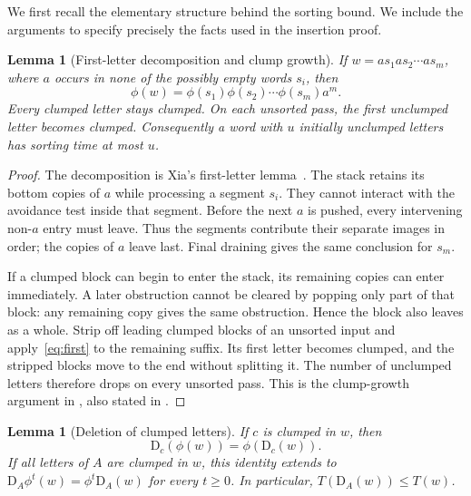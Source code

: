 \documentclass[11pt,a4paper]{article}
\newtheorem{lemma}[theorem]{Lemma}
\newcommand{\D}{\mathrm{D}}
\begin{document}
We first recall the elementary structure behind the sorting bound. We
include the arguments to specify precisely the facts used in the insertion
proof.

\begin{lemma}[First-letter decomposition and clump growth]
\label{lem:clump}
If $w=a s_1 a s_2\cdots a s_m$, where $a$ occurs in none of the possibly
empty words $s_i$, then
\begin{equation}\label{eq:first}
 \phi(w)=\phi(s_1)\phi(s_2)\cdots\phi(s_m)a^m.
\end{equation}
Every clumped letter stays clumped. On each unsorted pass, the first
unclumped letter becomes clumped. Consequently a word with $u$ initially
unclumped letters has sorting time at most $u$.
\end{lemma}

\begin{proof}
The decomposition is Xia's first-letter lemma~\cite[Lemma 3.1]{Xia2024}.
The stack retains its bottom copies of $a$ while processing a segment $s_i$.
They cannot interact with the avoidance test inside that segment. Before
the next $a$ is pushed, every intervening non-$a$ entry must leave. Thus the
segments contribute their separate images in order; the copies of $a$
leave last. Final draining gives the same conclusion for $s_m$.

If a clumped block can begin to enter the stack, its remaining copies can
enter immediately. A later obstruction cannot be cleared by popping only
part of that block: any remaining copy gives the same obstruction. Hence
the block also leaves as a whole. Strip off leading clumped blocks of an
unsorted input and apply~\eqref{eq:first} to the remaining suffix. Its first
letter becomes clumped, and the stripped blocks move to the end without
splitting it. The number of unclumped letters therefore drops on every
unsorted pass. This is the clump-growth argument in
\cite[proof of Theorem 3.1]{Xia2024}, also stated in
\cite[Corollary 2.1]{ChoiGanLiZhu2025}.
\end{proof}

\begin{lemma}[Deletion of clumped letters]\label{lem:delete}
If $c$ is clumped in $w$, then
\begin{equation}\label{eq:delete}
 \D_c(\phi(w))=\phi(\D_c(w)).
\end{equation}
If all letters of $A$ are clumped in $w$, this identity extends to
$\D_A\phi^t(w)=\phi^t\D_A(w)$ for every $t\geq0$. In particular,
$T(\D_A(w))\leq T(w)$.
\end{lemma}
\end{document}
